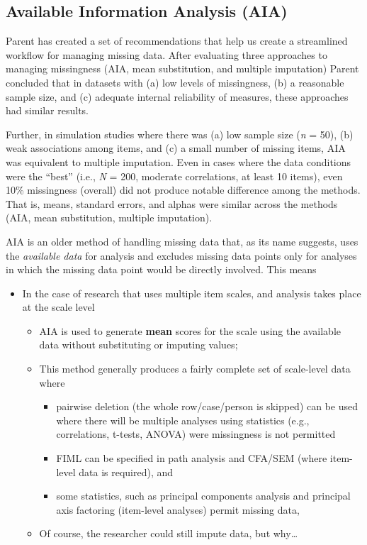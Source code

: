 \documentclass[
  11pt,
]{book}
\providecommand{\tightlist}{%
  \setlength{\itemsep}{0pt}\setlength{\parskip}{0pt}}
\begin{document}
\hypertarget{available-information-analysis-aia}{%
\subsection{Available Information Analysis (AIA)}\label{available-information-analysis-aia}}

Parent \citeyearpar{parent_handling_2013} has created a set of recommendations that help us create a streamlined workflow for managing missing data. After evaluating three approaches to managing missingness (AIA, mean substitution, and multiple imputation) Parent concluded that in datasets with (a) low levels of missingness, (b) a reasonable sample size, and (c) adequate internal reliability of measures, these approaches had similar results.

Further, in simulation studies where there was (a) low sample size (\emph{n} = 50), (b) weak associations among items, and (c) a small number of missing items, AIA was equivalent to multiple imputation. Even in cases where the data conditions were the ``best'' (i.e., \emph{N} = 200, moderate correlations, at least 10 items), even 10\% missingness (overall) did not produce notable difference among the methods. That is, means, standard errors, and alphas were similar across the methods (AIA, mean substitution, multiple imputation).

AIA is an older method of handling missing data that, as its name suggests, uses the \emph{available data} for analysis and excludes missing data points only for analyses in which the missing data point would be directly involved. This means

\begin{itemize}
\tightlist
\item
  In the case of research that uses multiple item scales, and analysis takes place at the scale level

  \begin{itemize}
  \tightlist
  \item
    AIA is used to generate \textbf{mean} scores for the scale using the available data without substituting or imputing values;
  \item
    This method generally produces a fairly complete set of scale-level data where

    \begin{itemize}
    \tightlist
    \item
      pairwise deletion (the whole row/case/person is skipped) can be used where there will be multiple analyses using statistics (e.g., correlations, t-tests, ANOVA) were missingness is not permitted
    \item
      FIML can be specified in path analysis and CFA/SEM (where item-level data is required), and
    \item
      some statistics, such as principal components analysis and principal axis factoring (item-level analyses) permit missing data,
    \end{itemize}
  \item
    Of course, the researcher could still impute data, but why\ldots{}
  \end{itemize}
\end{itemize}
\end{document}
